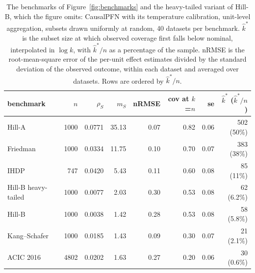 \begin{table}[tp]
\centering
\footnotesize
\setlength{\tabcolsep}{4pt}
\begin{tabular}{lrrrrrrr}
\toprule
\textbf{benchmark} & \textbf{$n$} & \textbf{$\rho_S$} & \textbf{$m_S$} & \textbf{nRMSE} & \textbf{cov at $k$=$n$} & \textbf{se} & \textbf{$\hat k^*$ ($\hat k^*/n$)} \\
\midrule
Hill-A & 1000 & 0.0771 & 35.13 & 0.07 & 0.82 & 0.06 & 502 (50\%) \\
Friedman & 1000 & 0.0334 & 11.75 & 0.10 & 0.70 & 0.07 & 383 (38\%) \\
IHDP & 747 & 0.0420 & 5.43 & 0.11 & 0.60 & 0.08 & 85 (11\%) \\
Hill-B heavy-tailed & 1000 & 0.0077 & 2.03 & 0.30 & 0.53 & 0.08 & 62 (6.2\%) \\
Hill-B & 1000 & 0.0038 & 1.42 & 0.28 & 0.53 & 0.08 & 58 (5.8\%) \\
Kang--Schafer & 1000 & 0.0185 & 1.43 & 0.09 & 0.30 & 0.07 & 21 (2.1\%) \\
ACIC 2016 & 4802 & 0.0202 & 1.63 & 0.27 & 0.20 & 0.06 & 30 (0.6\%) \\
\bottomrule
\end{tabular}
\caption{The benchmarks of Figure~\ref{fig:benchmarks} and the heavy-tailed variant of Hill-B, which the figure omits: CausalPFN with its temperature calibration, unit-level aggregation, subsets drawn uniformly at random, 40 datasets per benchmark. $\hat k^*$ is the subset size at which observed coverage first falls below nominal, interpolated in $\log k$, with $\hat k^*/n$ as a percentage of the sample. nRMSE is the root-mean-square error of the per-unit effect estimates divided by the standard deviation of the observed outcome, within each dataset and averaged over datasets. Rows are ordered by $\hat k^*/n$.}
\label{tab:legacy}
\end{table}
